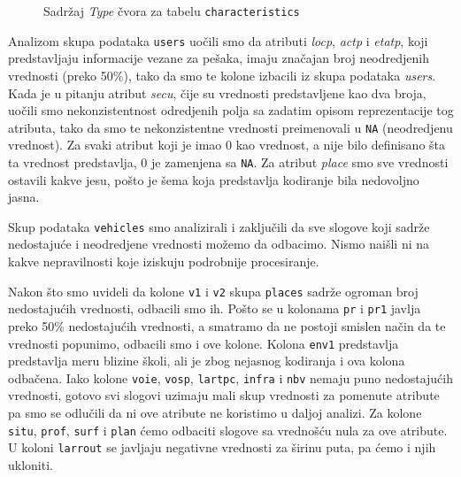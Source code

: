 \documentclass[a4paper,10pt]{article}
\begin{document}
\begin{figure}[h!]
 \centering
 \caption{Sadržaj \textit{Type} čvora za tabelu \texttt{characteristics}}
\end{figure}

Analizom skupa podataka \texttt{users} uočili smo da atributi \textit{locp}, \textit{actp} i \textit{etatp}, koji predstavljaju informacije vezane
za pešaka, imaju značajan broj neodredjenih vrednosti (preko 50\%), tako da smo te kolone izbacili iz skupa podataka \textit{users}. Kada je u pitanju
atribut \textit{secu}, čije su vrednosti predstavljene kao dva broja, uočili smo nekonzistentnost odredjenih polja sa zadatim opisom reprezentacije tog atributa,
tako da smo te nekonzistentne vrednosti preimenovali u \texttt{NA} (neodredjenu vrednost). Za svaki atribut koji je imao 0 kao vrednost, a nije bilo definisano
šta ta vrednost predstavlja, 0 je zamenjena sa \texttt{NA}. Za atribut \textit{place} smo sve vrednosti ostavili kakve jesu, pošto je šema 
koja predstavlja kodiranje bila nedovoljno jasna.

Skup podataka \texttt{vehicles} smo analizirali i zaključili da sve slogove koji sadrže nedostajuće i neodredjene 
vrednosti možemo da odbacimo. Nismo naišli ni na kakve nepravilnosti koje iziskuju podrobnije procesiranje.

Nakon što smo uvideli da kolone \texttt{v1} i \texttt{v2} skupa \texttt{places} sadrže ogroman broj nedostajućih
vrednosti, odbacili smo ih. Pošto se u kolonama \texttt{pr} i \texttt{pr1} javlja preko 50\% nedostajućih vrednosti, a smatramo da ne postoji
smislen način da te vrednosti popunimo, odbacili smo i ove kolone. Kolona \texttt{env1} predstavlja predstavlja meru blizine
školi, ali je zbog nejasnog kodiranja i ova kolona odbačena. Iako kolone \texttt{voie}, \texttt{vosp}, \texttt{lartpc}, \texttt{infra}
i \texttt{nbv} nemaju puno nedostajućih vrednosti, gotovo svi slogovi uzimaju mali skup vrednosti za pomenute atribute pa smo 
se odlučili da ni ove atribute ne koristimo u daljoj analizi. Za kolone \texttt{situ}, \texttt{prof}, \texttt{surf} i \texttt{plan}
ćemo odbaciti slogove sa vrednošću nula za ove atribute. U koloni \texttt{larrout} se javljaju negativne vrednosti za širinu
puta, pa ćemo i njih ukloniti.
\end{document}

